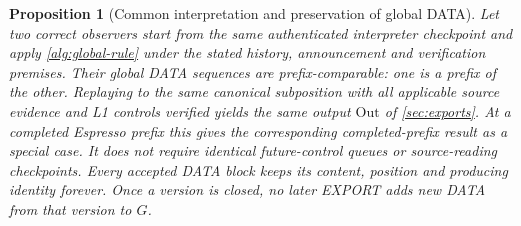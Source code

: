 \documentclass[11pt,a4paper]{article}
\newtheorem{proposition}[proposition]{Proposition}
\begin{document}
\begin{proposition}[Common interpretation and preservation of global DATA]
\label{prop:global-prefix}
Let two correct observers start from the same authenticated interpreter
checkpoint and apply \cref{alg:global-rule} under the stated history,
announcement and verification premises. Their global DATA sequences are
prefix-comparable: one is a prefix of the other. Replaying to the same canonical subposition with all applicable source
evidence and L1 controls verified yields the same output
$\mathrm{Out}$ of \cref{sec:exports}. At a completed Espresso prefix
this gives the corresponding completed-prefix result as a special case. It does not require identical
future-control queues or source-reading checkpoints. Every accepted DATA
block keeps its content,
position and producing identity forever. Once a version is closed, no
later EXPORT adds new DATA from that version to $G$.
\end{proposition}
\end{document}
